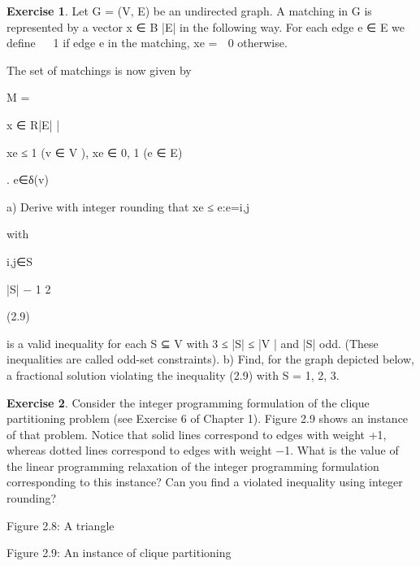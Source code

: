 \documentclass[titlepage]{book}
\theoremstyle{plain}
\theoremstyle{definition}
\newtheorem{exercise}{Exercise}[chapter]
\theoremstyle{remark}
\begin{document}
\begin{exercise}
Let G = (V, E) be an undirected graph. A matching in G is represented by a vector x ∈ B |E| in the
following way. For each edge e ∈ E we define

 1 if edge e in the matching,
xe =
 0 otherwise.

The set of matchings is now given by

M = {x ∈ R|E| |

xe ≤ 1 (v ∈ V ), xe ∈ {0, 1} (e ∈ E)}.
e∈δ(v)

a) Derive with integer rounding that
xe ≤
e:e={i,j}

with

i,j∈S

|S| − 1
2

(2.9)

is a valid inequality for each S ⊆ V with 3 ≤ |S| ≤ |V | and |S| odd. (These inequalities are called
odd-set constraints).
b) Find, for the graph depicted below, a fractional solution violating the inequality (2.9) with S =
{1, 2, 3}.
\end{exercise}
\begin{exercise}
Consider the integer programming formulation of the clique partitioning problem (see Exercise 6 of
Chapter 1). Figure 2.9 shows an instance of that problem. Notice that solid lines correspond to edges
with weight +1, whereas dotted lines correspond to edges with weight −1. What is the value of the linear
programming relaxation of the integer programming formulation corresponding to this instance? Can
you find a violated inequality using integer rounding?
\end{exercise}

Figure 2.8: A triangle


Figure 2.9: An instance of clique partitioning



\end{document}
